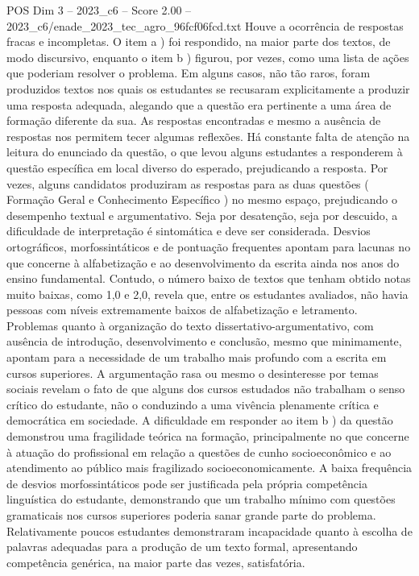 \begin{textsample}{POS Dim 3 – 2023\_c6 – Score 2.00 – 2023\_c6/enade\_2023\_tec\_agro\_96fcf06fcd.txt}
Houve a ocorrência de respostas fracas e incompletas.
O item a ) foi respondido, na maior parte dos textos, de modo discursivo, enquanto o item b ) figurou, por vezes, como uma lista de ações que poderiam resolver o problema.
Em alguns casos, não tão raros, foram produzidos textos nos quais os estudantes se recusaram explicitamente a produzir uma resposta adequada, alegando que a questão era pertinente a uma área de formação diferente da sua.
As respostas encontradas e mesmo a ausência de respostas nos permitem tecer algumas reflexões.
Há constante falta de atenção na leitura do enunciado da questão, o que levou alguns estudantes a responderem à questão específica em local diverso do esperado, prejudicando a resposta.
Por vezes, alguns candidatos produziram as respostas para as duas questões ( Formação Geral e Conhecimento Específico ) no mesmo espaço, prejudicando o desempenho textual e argumentativo.
Seja por desatenção, seja por descuido, a dificuldade de interpretação é sintomática e deve ser considerada.
Desvios ortográficos, morfossintáticos e de pontuação frequentes apontam para lacunas no que concerne à alfabetização e ao desenvolvimento da escrita ainda nos anos do ensino fundamental.
Contudo, o número baixo de textos que tenham obtido notas muito baixas, como 1,0 e 2,0, revela que, entre os estudantes avaliados, não havia pessoas com níveis extremamente baixos de alfabetização e letramento.
Problemas quanto à organização do texto dissertativo-argumentativo, com ausência de introdução, desenvolvimento e conclusão, mesmo que minimamente, apontam para a necessidade de um trabalho mais profundo com a escrita em cursos superiores.
A argumentação rasa ou mesmo o desinteresse por temas sociais revelam o fato de que alguns dos cursos estudados não trabalham o senso crítico do estudante, não o conduzindo a uma vivência plenamente crítica e democrática em sociedade.
A dificuldade em responder ao item b ) da questão demonstrou uma fragilidade teórica na formação, principalmente no que concerne à atuação do profissional em relação a questões de cunho socioeconômico e ao atendimento ao público mais fragilizado socioeconomicamente.
A baixa frequência de desvios morfossintáticos pode ser justificada pela própria competência linguística do estudante, demonstrando que um trabalho mínimo com questões gramaticais nos cursos superiores poderia sanar grande parte do problema.
Relativamente poucos estudantes demonstraram incapacidade quanto à escolha de palavras adequadas para a produção de um texto formal, apresentando competência genérica, na maior parte das vezes, satisfatória.

\end{textsample}
